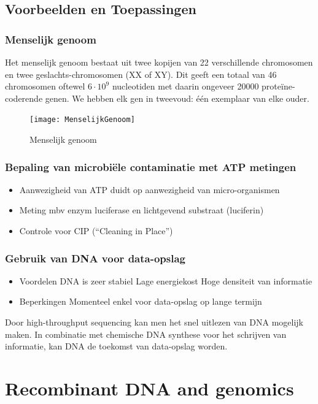 \documentclass[a4paper,kul]{kulakarticle} %
\begin{document}
\newpage
\subsection{Voorbeelden en Toepassingen}
\subsubsection{Menselijk genoom}
Het menselijk genoom bestaat uit twee kopijen van 22 verschillende chromosomen en twee geslachts-chromosomen (XX of XY). Dit geeft een totaal van 46 chromosomen oftewel $6\cdot10^9$ nucleotiden met daarin ongeveer \num{20000} proteïne-coderende genen. We hebben elk gen in tweevoud: één exemplaar van elke ouder.
\begin{figure}[h]
	\centering
	\texttt{[image: MenselijkGenoom]}
	\caption[Menselijk genoom]{Menselijk genoom}
	\label{fig:menselijkgenoom}
\end{figure}

\subsubsection{Bepaling van microbiële contaminatie met ATP metingen}
\begin{itemize}
	\item Aanwezigheid van ATP duidt op aanwezigheid van micro-organismen
	\item Meting mbv enzym luciferase en lichtgevend substraat (luciferin)
	\item Controle voor CIP (“Cleaning in Place”)
\end{itemize}
\subsubsection{Gebruik van DNA voor data-opslag}
\begin{itemize}
	\item Voordelen
	\subitem DNA is zeer stabiel
	\subitem Lage energiekost 
	\subitem Hoge densiteit van informatie
	\item Beperkingen
	\subitem Momenteel enkel voor data-opslag op lange termijn
\end{itemize}
Door high-throughput sequencing kan men het snel uitlezen van DNA mogelijk maken. In combinatie met chemische DNA synthese voor het schrijven van informatie, kan DNA de toekomst van data-opslag worden. 

\newpage
\section{Recombinant DNA and genomics}
\label{sec:dnaandgenomics}
\end{document}

